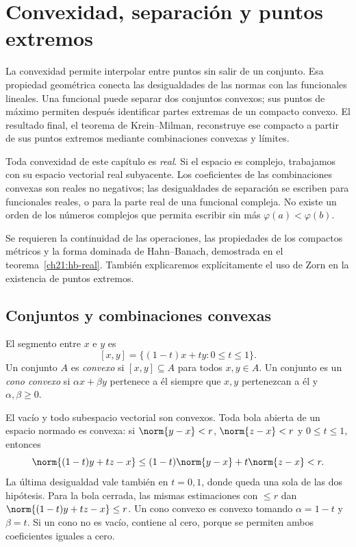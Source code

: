 \chapter{Convexidad, separación y puntos extremos}\label{chap:24}

La convexidad permite interpolar entre puntos sin salir de un conjunto. Esa propiedad geométrica conecta las desigualdades de las normas con las funcionales lineales. Una funcional puede separar dos conjuntos convexos; sus puntos de máximo permiten después identificar partes extremas de un compacto convexo. El resultado final, el teorema de Krein--Milman, reconstruye ese compacto a partir de sus puntos extremos mediante combinaciones convexas y límites.

Toda convexidad de este capítulo es \emph{real}. Si el espacio es complejo, trabajamos con su espacio vectorial real subyacente. Los coeficientes de las combinaciones convexas son reales no negativos; las desigualdades de separación se escriben para funcionales reales, o para la parte real de una funcional compleja. No existe un orden de los números complejos que permita escribir sin más $\varphi(a)<\varphi(b)$.

Se requieren la continuidad de las operaciones, las propiedades de los compactos métricos y la forma dominada de Hahn--Banach, demostrada en el teorema~\ref{ch21:hb-real}. También explicaremos explícitamente el uso de Zorn en la existencia de puntos extremos.

\section{Conjuntos y combinaciones convexas}

\begin{definicion}
El segmento entre $x$ e $y$ es
\[
 [x,y]=\{(1-t)x+ty:0\leq t\leq1\}.
\]
Un conjunto $A$ es \emph{convexo} si $[x,y]\subseteq A$ para todos $x,y\in A$. Un conjunto es un \emph{cono convexo} si $\alpha x+\beta y$ pertenece a él siempre que $x,y$ pertenezcan a él y $\alpha,\beta\geq0$.
\end{definicion}

\begin{ejemplo}
El vacío y todo subespacio vectorial son convexos. Toda bola abierta de un espacio normado es convexa: si $\norm{y-x}<r$, $\norm{z-x}<r$ y $0\leq t\leq1$, entonces
\[
 \norm{(1-t)y+tz-x}\leq(1-t)\norm{y-x}+t\norm{z-x}<r.
\]
La última desigualdad vale también en $t=0,1$, donde queda una sola de las dos hipótesis. Para la bola cerrada, las mismas estimaciones con $\leq r$ dan $\norm{(1-t)y+tz-x}\leq r$. Un cono convexo es convexo tomando $\alpha=1-t$ y $\beta=t$. Si un cono no es vacío, contiene al cero, porque se permiten ambos coeficientes iguales a cero.
\end{ejemplo}

